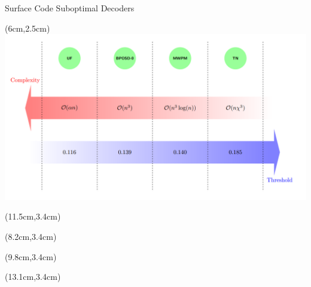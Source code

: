 \documentclass{dfki}
\begin{document}
\begin{frame}{Surface Code Suboptimal Decoders}
	\begin{textblock*}{9cm}(6cm,2.5cm)
        \includegraphics[width=1\textwidth]{fig/Screenshot from 2025-03-24 15-21-55.png}
    \end{textblock*}
	\begin{textblock*}{2cm}(11.5cm,3.4cm)
		\begin{tiny}
			\cite{edmonds_paths_1965}
		\end{tiny}
	\end{textblock*}
	\begin{textblock*}{2cm}(8.2cm,3.4cm)
		\begin{tiny}
			\cite{delfosse_almost-linear_2021}
		\end{tiny}
	\end{textblock*}
	\begin{textblock*}{2cm}(9.8cm,3.4cm)
		\begin{tiny}
			\cite{panteleev_degenerate_2021}
		\end{tiny}
	\end{textblock*}
	\begin{textblock*}{2cm}(13.1cm,3.4cm)
		\begin{tiny}
			\cite{bravyi_efficient_2014,chubb_general_2021}
		\end{tiny}
	\end{textblock*}


\end{frame}
\end{document}
